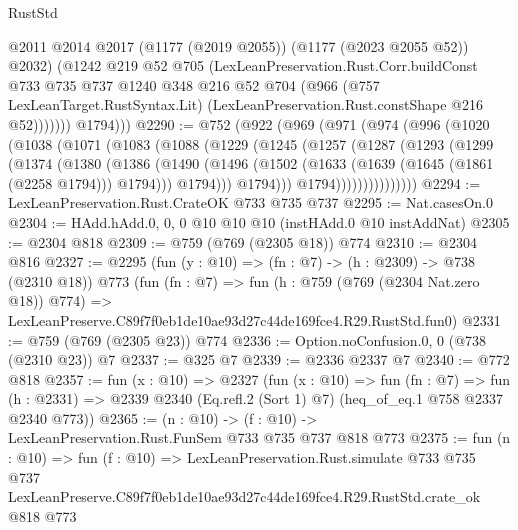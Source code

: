 \begin{lexlean}{RustStd}
\begin{coremodule}
                  @2011
                  @2014
                  @2017
                  (@1177 (@2019 @2055))
                  (@1177 (@2023 @2055 @52))
                  @2032)
                (@1242
                  @219
                  @52
                  @705
                  (LexLeanPreservation.Rust.Corr.buildConst
                    @733
                    @735
                    @737
                    @1240
                    @348
                    @216
                    @52
                    @704
                    (@966
                      (@757 LexLeanTarget.RustSyntax.Lit)
                      (LexLeanPreservation.Rust.constShape @216 @52)))))))
          @1794)))
@2290 := @752
    (@922
      (@969
        (@971
          (@974
            (@996
              (@1020
                (@1038
                  (@1071
                    (@1083
                      (@1088
                        (@1229
                          (@1245
                            (@1257
                              (@1287
                                (@1293
                                  (@1299
                                    (@1374
                                      (@1380
                                        (@1386
                                          (@1490
                                            (@1496
                                              (@1502
                                                (@1633 (@1639 (@1645 (@1861 (@2258 @1794))) @1794)))
                                              @1794)))
                                        @1794)))
                                  @1794)))))))))))))))
@2294 := LexLeanPreservation.Rust.CrateOK @733 @735 @737
@2295 := Nat.casesOn.{0}
@2304 := HAdd.hAdd.{0, 0, 0} @10 @10 @10 (instHAdd.{0} @10 instAddNat)
@2305 := @2304 @818
@2309 := @759 (@769 (@2305 @18)) @774
@2310 := @2304 @816
@2327 := @2295
    (fun (y : @10) => (fn : @7) -> (h : @2309) -> @738 (@2310 @18))
    @773
    (fun (fn : @7) =>
    fun (h : @759 (@769 (@2304 Nat.zero @18)) @774) =>
    LexLeanPreserve.C89f7f0eb1de10ae93d27c44de169fce4.R29.RustStd.fun0)
@2331 := @759 (@769 (@2305 @23)) @774
@2336 := Option.noConfusion.{0, 0} (@738 (@2310 @23)) @7
@2337 := @325 @7
@2339 := @2336 @2337 @7
@2340 := @772 @818
@2357 := fun (x : @10) =>
  @2327
    (fun (x : @10) =>
    fun (fn : @7) =>
    fun (h : @2331) => @2339 @2340 (Eq.refl.{2} (Sort 1) @7) (heq_of_eq.{1} @758 @2337 @2340 @773))
@2365 := (n : @10) -> (f : @10) -> LexLeanPreservation.Rust.FunSem @733 @735 @737 @818 @773
@2375 := fun (n : @10) =>
  fun (f : @10) =>
  LexLeanPreservation.Rust.simulate
    @733
    @735
    @737
    LexLeanPreserve.C89f7f0eb1de10ae93d27c44de169fce4.R29.RustStd.crate_ok
    @818
    @773
\end{coremodule}
\end{lexlean}
